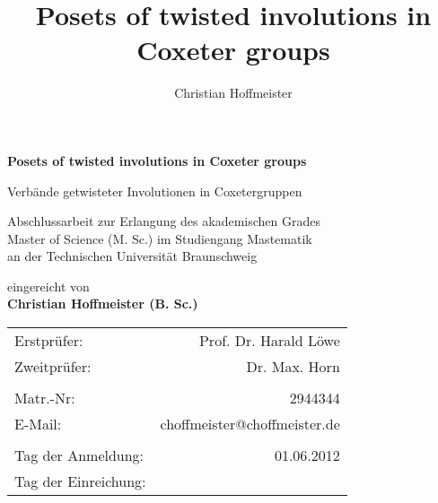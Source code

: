 \title{Posets of twisted involutions in Coxeter groups}
\author{Christian Hoffmeister}

\begin{titlepage}
\begin{center}
{\Large \bf Posets of twisted involutions in Coxeter groups}

{\large Verbände getwisteter Involutionen in Coxetergruppen}

\vspace*{4cm}
Abschlussarbeit zur Erlangung des akademischen Grades\\Master of Science (M. Sc.) im Studiengang Mastematik\\an der Technischen Universität Braunschweig

\vspace*{4cm}
eingereicht von \\
{\Large \bf Christian Hoffmeister (B. Sc.)}

\vspace*{4cm}
\begin{tabular}{lr}
	Erstprüfer: & Prof. Dr. Harald Löwe \\
	Zweitprüfer: & Dr. Max. Horn \\
	\vspace*{0.5em} & \\
	Matr.-Nr: & 2944344 \\
	E-Mail: & choffmeister@choffmeister.de \\
	\vspace*{0.5em} & \\
	Tag der Anmeldung: & 01.06.2012 \\
	Tag der Einreichung: & \\
\end{tabular}
\end{center}
\end{titlepage}